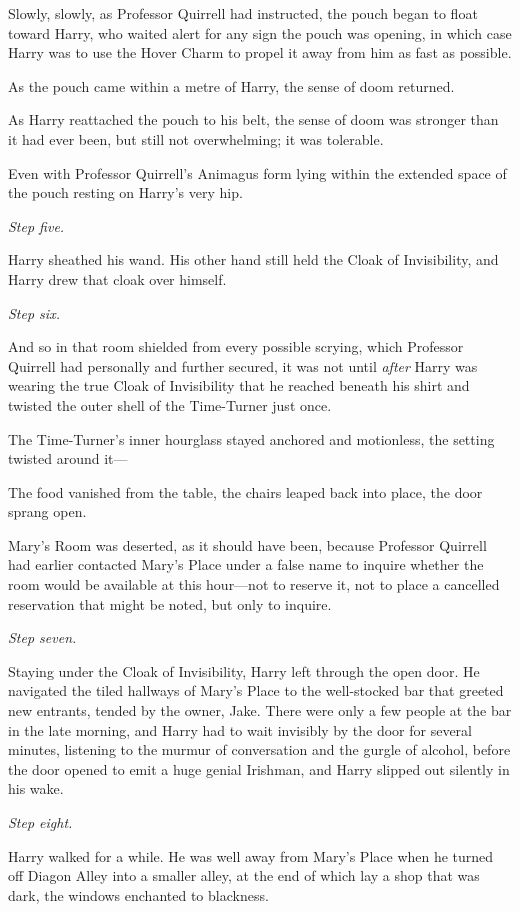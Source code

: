 Slowly, slowly, as Professor Quirrell had instructed, the pouch began to float
toward Harry, who waited alert for any sign the pouch was opening, in which
case Harry was to use the Hover Charm to propel it away from him as fast as
possible.

As the pouch came within a metre of Harry, the sense of doom returned.

As Harry reattached the pouch to his belt, the sense of doom was stronger than
it had ever been, but still not overwhelming; it was tolerable.

Even with Professor Quirrell’s Animagus form lying within the extended space of
the pouch resting on Harry’s very hip.

\emph{Step five.}

Harry sheathed his wand. His other hand still held the Cloak of Invisibility,
and Harry drew that cloak over himself.

\emph{Step six.}

And so in that room shielded from every possible scrying, which Professor
Quirrell had personally and further secured, it was not until \emph{after}
Harry was wearing the true Cloak of Invisibility that he reached beneath his
shirt and twisted the outer shell of the Time-Turner just once.

The Time-Turner’s inner hourglass stayed anchored and motionless, the setting
twisted around it—

The food vanished from the table, the chairs leaped back into place, the door
sprang open.

Mary’s Room was deserted, as it should have been, because Professor Quirrell
had earlier contacted Mary’s Place under a false name to inquire whether the
room would be available at this hour—not to reserve it, not to place a
cancelled reservation that might be noted, but only to inquire.

\emph{Step seven.}

Staying under the Cloak of Invisibility, Harry left through the open door. He
navigated the tiled hallways of Mary’s Place to the well-stocked bar that
greeted new entrants, tended by the owner, Jake. There were only a few people
at the bar in the late morning, and Harry had to wait
invisibly by the door for several minutes, listening to the murmur of
conversation and the gurgle of alcohol, before the door opened to emit a huge
genial Irishman, and Harry slipped out silently in his wake.

\emph{Step eight.}

Harry walked for a while. He was well away from Mary’s Place when he turned off
Diagon Alley into a smaller alley, at the end of which lay a shop that was
dark, the windows enchanted to blackness.

